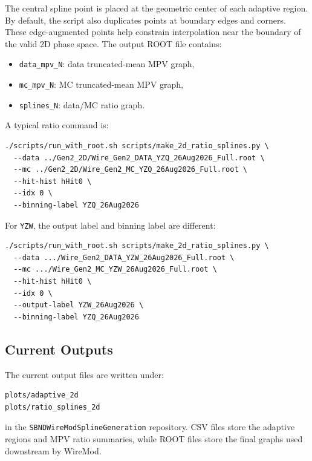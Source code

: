 \documentclass{article}
\begin{document}
The central spline point is placed at the geometric center of each adaptive region. By default, the script also duplicates points at boundary edges and corners. These edge-augmented points help constrain interpolation near the boundary of the valid 2D phase space. The output ROOT file contains:
\begin{itemize}
    \item \texttt{data\_mpv\_N}: data truncated-mean MPV graph,
    \item \texttt{mc\_mpv\_N}: MC truncated-mean MPV graph,
    \item \texttt{splines\_N}: data/MC ratio graph.
\end{itemize}

A typical ratio command is:
\begin{verbatim}
./scripts/run_with_root.sh scripts/make_2d_ratio_splines.py \
  --data ../Gen2_2D/Wire_Gen2_DATA_YZQ_26Aug2026_Full.root \
  --mc ../Gen2_2D/Wire_Gen2_MC_YZQ_26Aug2026_Full.root \
  --hit-hist hHit0 \
  --idx 0 \
  --binning-label YZQ_26Aug2026
\end{verbatim}

For \texttt{YZW}, the output label and binning label are different:
\begin{verbatim}
./scripts/run_with_root.sh scripts/make_2d_ratio_splines.py \
  --data .../Wire_Gen2_DATA_YZW_26Aug2026_Full.root \
  --mc .../Wire_Gen2_MC_YZW_26Aug2026_Full.root \
  --hit-hist hHit0 \
  --idx 0 \
  --output-label YZW_26Aug2026 \
  --binning-label YZQ_26Aug2026
\end{verbatim}

\subsection{Current Outputs}

The current output files are written under:
\begin{verbatim}
plots/adaptive_2d
plots/ratio_splines_2d
\end{verbatim}
in the \texttt{SBNDWireModSplineGeneration} repository. CSV files store the adaptive regions and MPV ratio summaries, while ROOT files store the final graphs used downstream by WireMod.
\end{document}
